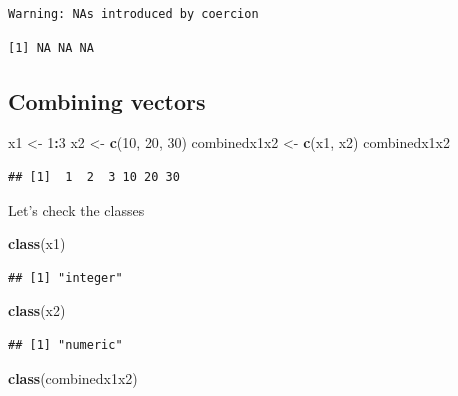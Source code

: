 \documentclass[]{book}
\newenvironment{Shaded}{\begin{snugshade}}{\end{snugshade}}
\newcommand{\DecValTok}[1]{\textcolor[rgb]{0.00,0.00,0.81}{#1}}
\newcommand{\KeywordTok}[1]{\textcolor[rgb]{0.13,0.29,0.53}{\textbf{#1}}}
\newcommand{\NormalTok}[1]{#1}
\newcommand{\OperatorTok}[1]{\textcolor[rgb]{0.81,0.36,0.00}{\textbf{#1}}}
\newcommand{\StringTok}[1]{\textcolor[rgb]{0.31,0.60,0.02}{#1}}
\begin{document}
\begin{verbatim}
Warning: NAs introduced by coercion
\end{verbatim}

\begin{verbatim}
[1] NA NA NA
\end{verbatim}

\hypertarget{combining-vectors}{%
\subsection{Combining vectors}\label{combining-vectors}}

\begin{Shaded}
\begin{Highlighting}[]
\NormalTok{x1 <-}\StringTok{ }\DecValTok{1}\OperatorTok{:}\DecValTok{3}
\NormalTok{x2 <-}\StringTok{ }\KeywordTok{c}\NormalTok{(}\DecValTok{10}\NormalTok{, }\DecValTok{20}\NormalTok{, }\DecValTok{30}\NormalTok{)}
\NormalTok{combinedx1x2 <-}\StringTok{ }\KeywordTok{c}\NormalTok{(x1, x2)}
\NormalTok{combinedx1x2 }
\end{Highlighting}
\end{Shaded}

\begin{verbatim}
## [1]  1  2  3 10 20 30
\end{verbatim}

Let's check the classes

\begin{Shaded}
\begin{Highlighting}[]
\KeywordTok{class}\NormalTok{(x1)}
\end{Highlighting}
\end{Shaded}

\begin{verbatim}
## [1] "integer"
\end{verbatim}

\begin{Shaded}
\begin{Highlighting}[]
\KeywordTok{class}\NormalTok{(x2)}
\end{Highlighting}
\end{Shaded}

\begin{verbatim}
## [1] "numeric"
\end{verbatim}

\begin{Shaded}
\begin{Highlighting}[]
\KeywordTok{class}\NormalTok{(combinedx1x2)}
\end{Highlighting}
\end{Shaded}
\end{document}
